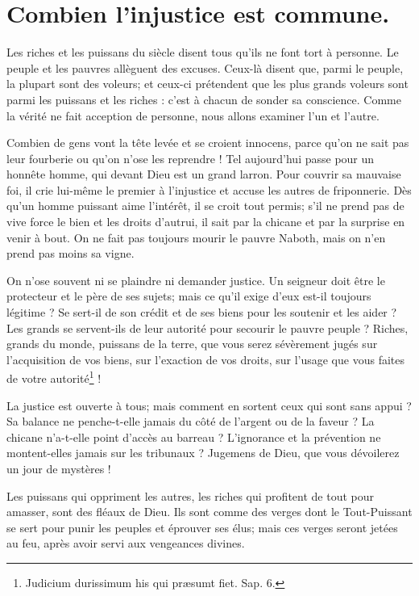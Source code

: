 \documentclass[instructions.tex]{subfiles}
\begin{document}
 
\chapter{Combien l’injustice est commune.}
 
Les riches et les puissans du siècle disent tous qu’ils ne font tort à personne. Le peuple et les pauvres allèguent des excuses. Ceux-là disent que, parmi le peuple, la plupart sont des voleurs; et ceux-ci prétendent que les plus grands voleurs sont parmi les puissans et les riches : c’est à chacun de sonder sa conscience. Comme la vérité ne fait acception de personne, nous allons examiner l’un et l’autre.
 
\primo Combien de gens vont la tête levée et se croient innocens, parce qu’on ne sait pas leur fourberie ou qu’on n’ose les reprendre ! Tel aujourd’hui passe pour un honnête homme, qui devant Dieu est un grand larron. Pour couvrir sa mauvaise foi, il crie lui-même le premier à l’injustice et accuse les autres de friponnerie. Dès qu’un homme puissant aime l’intérêt, il se croit tout permis; s’il ne prend pas de vive force le bien et les droits d’autrui, il sait par la chicane et par la surprise en venir à bout. On ne fait pas toujours mourir le pauvre Naboth, mais on n’en prend pas moins sa vigne.
 
On n’ose souvent ni se plaindre ni demander justice. Un seigneur doit être le protecteur et le père de ses sujets; mais ce qu’il exige d’eux est-il toujours légitime ? Se sert-il de son crédit et de ses biens pour les soutenir et les aider ? Les grands se servent-ils de leur autorité pour secourir le pauvre peuple ? Riches, grands du monde, puissans de la terre, que vous serez sévèrement jugés sur l’acquisition de vos biens, sur l’exaction de vos droits, sur l’usage que vous faites de votre autorité\footnote{Judicium durissimum his qui præsumt fiet. Sap. 6.} !
 
La justice est ouverte à tous; mais comment en sortent ceux qui sont sans appui ? Sa balance ne penche-t-elle jamais du côté de l’argent ou de la faveur ? La chicane n’a-t-elle point d’accès au barreau ? L’ignorance et la prévention ne montent-elles jamais sur les tribunaux ? Jugemens de Dieu, que vous dévoilerez un jour de mystères !
 
Les puissans qui oppriment les autres, les riches qui profitent de tout pour amasser, sont des fléaux de Dieu. Ils sont comme des verges dont le Tout-Puissant se sert pour punir les peuples et éprouver ses élus; mais ces verges seront jetées au feu, après avoir servi aux vengeances divines.
 
\end{document}
